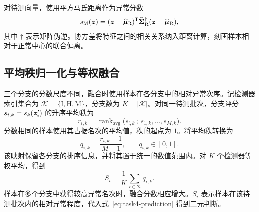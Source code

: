 对待测向量，使用平方马氏距离作为异常分数
\begin{equation}
  s_{\mathrm M}(\bm{z})
  =(\bm{z}-\widehat{\bm{\mu}}_{\mathrm R})^{\mathsf T}
   \widehat{\bm{\Sigma}}_{\mathrm R}^{\dagger}
   (\bm{z}-\widehat{\bm{\mu}}_{\mathrm R}),
  \label{eq:task4-mcd-score}
\end{equation}
其中 $\dagger$ 表示矩阵伪逆。协方差将特征之间的相关关系纳入距离计算，刻画样本相对于正常中心的联合偏离。

\subsection{平均秩归一化与等权融合}
三个分支的分数尺度不同，融合时使用样本在各分支中的相对异常次序。记检测器索引集合为 $\mathcal K=\{\mathrm I,\mathrm H,\mathrm M\}$，分支数为 $K=|\mathcal K|$。对同一待测批次，分支评分 $s_{i,k}=s_k(\bm{z}'_i)$ 的升序平均秩为
\begin{equation}
  r_{i,k}=\operatorname{rank}_{\mathrm{avg}}
     \bigl(s_{i,k}\,;\,s_{1,k},\ldots,s_{M,k}\bigr).
  \label{eq:task4-rank}
\end{equation}
分数相同的样本使用其占据名次的平均值，秩的起点为 $1$。将平均秩转换为
\begin{equation}
  q_{i,k}=\frac{r_{i,k}-1}{M-1},
  \qquad q_{i,k}\in[0,1].
  \label{eq:task4-rank-normalization}
\end{equation}
该映射保留各分支的排序信息，并将其置于统一的数值范围内。对 $K$ 个检测器等权平均，得到
\begin{equation}
  S_i=\frac{1}{K}\sum_{k\in\mathcal K}q_{i,k}.
  \label{eq:task4-fusion}
\end{equation}
样本在多个分支中获得较高异常名次时，融合分数相应增大。$S_i$ 表示样本在该待测批次内的相对异常程度，代入式~\eqref{eq:task4-prediction} 得到二元判断。
